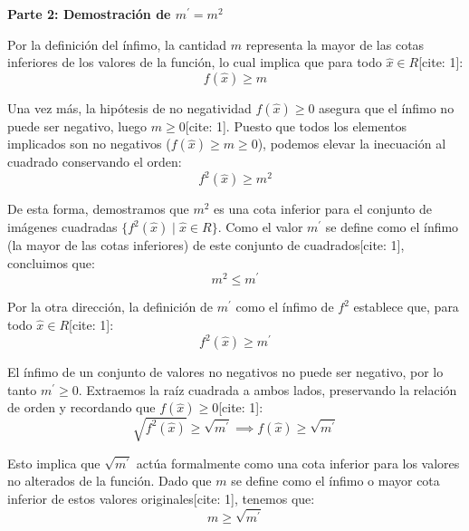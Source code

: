 \documentclass[11pt,letterpaper]{article}
\begin{document}
\vspace{0.5cm}
\textbf{Parte 2: Demostración de $m^{\prime} = m^{2}$}

Por la definición del ínfimo, la cantidad $m$ representa la mayor de las cotas inferiores de los valores de la función, lo cual implica que para todo $\hat{x} \in R$[cite: 1]:
\begin{equation*}
f(\hat{x}) \ge m
\end{equation*}

Una vez más, la hipótesis de no negatividad $f(\hat{x}) \ge 0$ asegura que el ínfimo no puede ser negativo, luego $m \ge 0$[cite: 1]. Puesto que todos los elementos implicados son no negativos ($f(\hat{x}) \ge m \ge 0$), podemos elevar la inecuación al cuadrado conservando el orden:
\begin{equation*}
f^{2}(\hat{x}) \ge m^{2}
\end{equation*}

De esta forma, demostramos que $m^{2}$ es una cota inferior para el conjunto de imágenes cuadradas $\{f^{2}(\hat{x}) \mid \hat{x} \in R\}$. Como el valor $m^{\prime}$ se define como el ínfimo (la mayor de las cotas inferiores) de este conjunto de cuadrados[cite: 1], concluimos que:
\begin{equation*}
m^{2} \le m^{\prime}
\end{equation*}

Por la otra dirección, la definición de $m^{\prime}$ como el ínfimo de $f^{2}$ establece que, para todo $\hat{x} \in R$[cite: 1]:
\begin{equation*}
f^{2}(\hat{x}) \ge m^{\prime}
\end{equation*}

El ínfimo de un conjunto de valores no negativos no puede ser negativo, por lo tanto $m^{\prime} \ge 0$. Extraemos la raíz cuadrada a ambos lados, preservando la relación de orden y recordando que $f(\hat{x}) \ge 0$[cite: 1]:
\begin{equation*}
\sqrt{f^{2}(\hat{x})} \ge \sqrt{m^{\prime}} \implies f(\hat{x}) \ge \sqrt{m^{\prime}}
\end{equation*}

Esto implica que $\sqrt{m^{\prime}}$ actúa formalmente como una cota inferior para los valores no alterados de la función. Dado que $m$ se define como el ínfimo o mayor cota inferior de estos valores originales[cite: 1], tenemos que:
\begin{equation*}
m \ge \sqrt{m^{\prime}}
\end{equation*}
\end{document}
